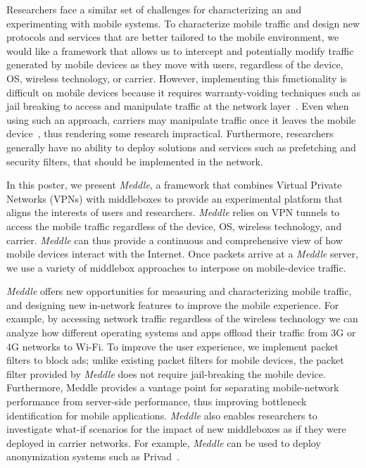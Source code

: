 \documentclass{sig-alternate}
\newcommand{\meddle}{{\em Meddle}\xspace}
\begin{document}
Researchers face a similar set of challenges for characterizing an
and experimenting with mobile systems. To characterize mobile traffic and
design new protocols and services that are better tailored to the
mobile environment, we would like a framework that allows us to
intercept and potentially modify traffic generated by mobile devices
as they move with users, regardless of the device, OS, wireless
technology, or carrier. However, implementing this functionality is
difficult on mobile devices because it requires warranty-voiding
techniques such as jail breaking to access and manipulate traffic at
the network layer~\cite{enck:taintdroid}. Even when using such an
approach, carriers may manipulate traffic once it leaves the mobile
device~\cite{wang:middleboxes}, thus rendering some research
impractical. Furthermore, researchers generally have no ability to 
deploy solutions and services such as prefetching and security
filters, that should be implemented in the network.

In this poster, we present \meddle, a framework that combines Virtual
Private Networks (VPNs) with middleboxes to provide an experimental
platform that aligns the interests of users and researchers. \meddle
relies on VPN tunnels to access the mobile traffic regardless of the
device, OS, wireless technology, and carrier. \meddle can thus provide
a continuous and comprehensive view of how mobile devices interact
with the Internet. Once packets arrive at a \meddle server, we use a
variety of middlebox approaches to interpose on mobile-device
traffic. 

\meddle offers new opportunities for measuring and characterizing
mobile traffic, and designing new in-network features to improve the
mobile experience. For example, by accessing network traffic
regardless of the wireless technology we can analyze how different
operating systems and apps offload their traffic from 3G or 4G
networks to Wi-Fi. To improve the user experience, we implement packet
filters to block ads; unlike existing packet filters for mobile
devices, the packet filter provided by \meddle does not require
jail-breaking the mobile device. Furthermore, Meddle provides a
vantage point for separating mobile-network performance from
server-side performance, thus improving bottleneck identification for
mobile applications. \meddle also enables researchers to investigate
what-if scenarios for the impact of new middleboxes as if they were
deployed in carrier networks. For example, \meddle can be used to
deploy anonymization systems such as Privad~\cite{guha:privad}.  
\end{document}
